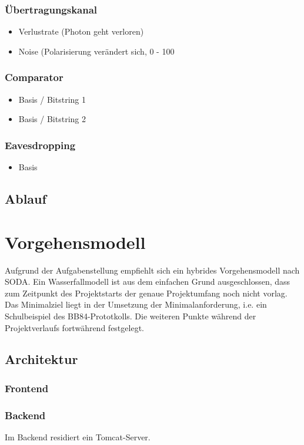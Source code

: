 \documentclass[a4paper,10.2pt,pdftex]{scrartcl}%
\begin{document}
\subsubsection*{ Übertragungskanal}
\begin{itemize}
\item  Verlustrate (Photon geht verloren)
\item  Noise (Polarisierung verändert sich, 0 - 100%
\end{itemize}

\subsubsection*{ Comparator}
\begin{itemize}
\item Basis / Bitstring 1
\item Basis / Bitstring 2
\end{itemize}
\subsubsection*{ Eavesdropping}
\begin{itemize}
\item  Basis
\end{itemize}

\subsection{Ablauf}
\section{Vorgehensmodell}
Aufgrund der Aufgabenstellung empfiehlt sich ein hybrides Vorgehensmodell nach SODA. Ein Wasserfallmodell ist aus dem einfachen Grund ausgeschlossen, dass zum Zeitpunkt des Projektstarts der genaue Projektumfang noch nicht vorlag. Das Minimalziel liegt in der Umsetzung der Minimalanforderung, i.e. ein Schulbeispiel des BB84-Prototkolls. Die weiteren Punkte während der Projektverlaufs fortwährend festgelegt. 


\subsection{Architektur}
\subsubsection{Frontend}
\subsubsection{Backend}
Im Backend residiert ein Tomcat-Server. 
\end{document}
